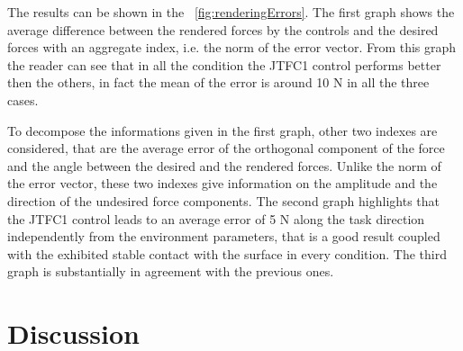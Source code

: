 \documentclass[journal]{IEEEtran}
\begin{document}
\par The results can be shown in the \figurename \ \ref{fig:renderingErrors}. The first graph shows the average difference between the rendered forces by the controls and the desired forces with an aggregate index, i.e. the norm of the error vector. From this graph the reader can see that in all the condition the JTFC1 control performs better then the others, in fact the mean of the error is around 10 N in all the three cases.
\par To decompose the informations given in the first graph, other two indexes are considered, that are the average error of the orthogonal component of the force and the angle between the desired and the rendered forces. Unlike the norm of the error vector, these two indexes give information on the amplitude and the direction of the undesired force components. The second graph highlights that the JTFC1 control leads to an average error of 5 N along the task direction independently from the environment parameters, that is a good result coupled with the exhibited stable contact with the surface in every condition.
The third graph is substantially in agreement with the previous ones.


\section{Discussion} \label{sec:discussion}
\end{document}
